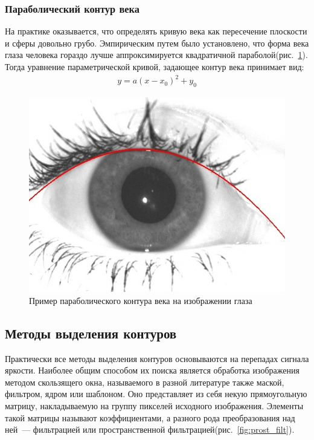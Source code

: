 \documentclass[12pt,a4paper]{article} %
\begin{document}
\subsubsection{Параболический контур века}

На практике оказывается, что определять кривую века как пересечение плоскости и сферы довольно грубо. Эмпирическим путем было установлено, что форма века глаза человека гораздо лучше аппроксимируется квадратичной параболой(рис.~\ref{fig:glaz5}). Тогда уравнение параметрической кривой, задающее контур века принимает вид:
\begin{gather}\label{par1}
	y = a(x-x_0)^2 + y_0
\end{gather}

\begin{figure}[h]
	
	\centering
	
	\includegraphics[width=0.5\linewidth]{glaz5.jpg}
	
	\caption{Пример параболического контура века на изображении глаза}
	
	\label{fig:glaz5}
	
\end{figure}

\newpage
\subsection{Методы выделения контуров}

Практически все методы выделения контуров основываются на перепадах сигнала яркости. Наиболее общим способом их поиска является обработка изображения методом скользящего окна, называемого в разной литературе также маской, фильтром, ядром или шаблоном. Оно представляет из себя некую прямоугольную матрицу, накладываемую на группу пикселей исходного изображения. Элементы такой матрицы называют коэффициентами, а разного рода преобразования над ней~--- фильтрацией или пространственной фильтрацией(рис.~\ref{fig:prost_filt}).
\end{document}
